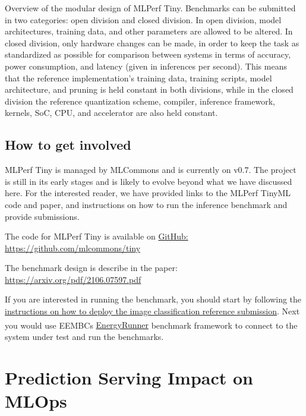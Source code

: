 {{{{{{{{           
    
    Overview of the modular design of MLPerf Tiny. Benchmarks can be submitted in two categories: open division and closed division. In open division, model architectures, training data, and other parameters are allowed to be altered. In closed division, only hardware changes can be made, in order to keep the task as standardized as possible for comparison between systems in terms of accuracy, power consumption, and latency (given in inferences per second). This means that the reference implementation's training data, training scripts, model architecture, and pruning is held constant in both divisions, while in the closed division the reference quantization scheme, compiler, inference framework, kernels, SoC, CPU, and accelerator are also held constant.
    
    \subsection{How to get involved}
    
    MLPerf Tiny is managed by MLCommons and is currently on v0.7. The project is still in its early stages and is likely to evolve beyond what we have discussed here. For the interested reader, we have provided links to the MLPerf TinyML code and paper, and instructions on how to run the inference benchmark and provide submissions.
    
    The code for MLPerf Tiny is available on \url{GitHub: https://github.com/mlcommons/tiny}
    
    The benchmark design is describe in the paper: \url{https://arxiv.org/pdf/2106.07597.pdf}
    
    If you are interested in running the benchmark, you should start by following the \href{https://github.com/mlcommons/tiny/tree/master/benchmark/reference_submissions/image_classification}{instructions on how to deploy the image classification reference submission}. Next you would use  EEMBCs \href{https://github.com/eembc/energyrunner}{EnergyRunner\textsuperscript{\texttrademark}} benchmark framework to connect to the system under test and run the benchmarks.        
        
\section{Prediction Serving Impact on MLOps}

}}}}}}}}
